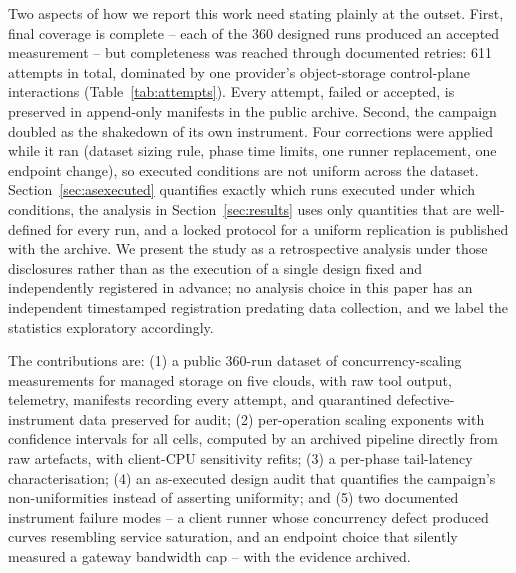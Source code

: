 \documentclass[manuscript,screen,review]{acmart}
\begin{document}
Two aspects of how we report this work need stating plainly at the outset.
First, final coverage is complete -- each of the 360 designed runs produced
an accepted measurement -- but completeness was reached through documented
retries: 611 attempts in total, dominated by one provider's object-storage
control-plane interactions (Table~\ref{tab:attempts}). Every attempt, failed
or accepted, is preserved in append-only manifests in the public archive.
Second, the campaign doubled as the shakedown of its own instrument. Four
corrections were applied while it ran (dataset sizing rule, phase time limits,
one runner replacement, one endpoint change), so executed conditions are not
uniform across the dataset. Section~\ref{sec:asexecuted} quantifies exactly
which runs executed under which conditions, the analysis in
Section~\ref{sec:results} uses only quantities that are well-defined for
every run, and a locked protocol for a uniform replication is published with
the archive. We present the study as a retrospective analysis under those
disclosures rather than as the execution of a single design fixed and
independently registered in advance; no analysis choice in this paper has
an independent timestamped registration predating data collection, and we
label the statistics exploratory accordingly.

The contributions are: (1) a public 360-run dataset of concurrency-scaling
measurements for managed storage on five clouds, with raw tool output,
telemetry, manifests recording every attempt, and quarantined
defective-instrument data preserved for audit; (2) per-operation scaling
exponents with confidence intervals for all cells, computed by an archived
pipeline directly from raw artefacts, with client-CPU sensitivity refits;
(3) a per-phase tail-latency characterisation; (4) an as-executed design
audit that quantifies the campaign's non-uniformities instead of asserting
uniformity; and (5) two documented instrument failure modes -- a client
runner whose concurrency defect produced curves resembling service
saturation, and an endpoint choice that silently measured a gateway
bandwidth cap -- with the evidence archived.
\end{document}
